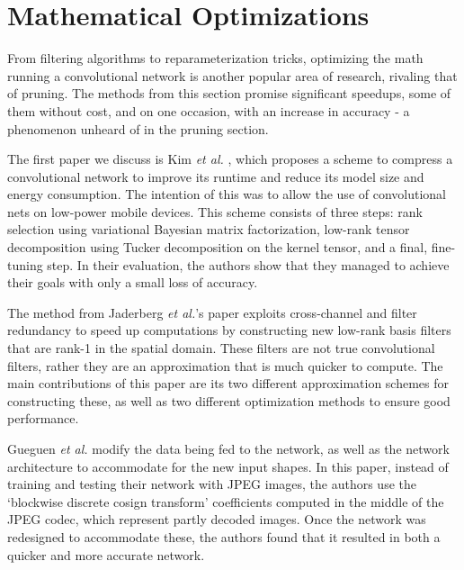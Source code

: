 \documentclass[11pt,a4paper,oldfontcommands]{memoir}
\begin{document}
\section{Mathematical Optimizations}
From filtering algorithms to reparameterization tricks, optimizing the math running a convolutional network is another popular area of research, rivaling that of pruning. The methods from this section promise significant speedups, some of them without cost, and on one occasion, with an increase in accuracy - a phenomenon unheard of in the pruning section. 

The first paper we discuss is Kim \textit{et al.} \cite{FLMA}, which proposes a scheme to compress a convolutional network to improve its runtime and reduce its model size and energy consumption. The intention of this was to allow the use of convolutional nets on low-power mobile devices. This scheme consists of three steps: rank selection using variational Bayesian matrix factorization, low-rank tensor decomposition using Tucker decomposition on the kernel tensor, and a final, fine-tuning step. In their evaluation, the authors show that they managed to achieve their goals with only a small loss of accuracy.

The method from Jaderberg \textit{et al.}'s paper \cite{LRE} exploits cross-channel and filter redundancy to speed up computations by constructing new low-rank basis filters that are rank-1 in the spatial domain. These filters are not true convolutional filters, rather they are an approximation that is much quicker to compute. The main contributions of this paper are its two different approximation schemes for constructing these, as well as two different optimization methods to ensure good performance. 

Gueguen \textit{et al.} \cite{FJPEG} modify the data being fed to the network, as well as the network architecture to accommodate for the new input shapes. In this paper, instead of training and testing their network with JPEG images, the authors use the `blockwise discrete cosign transform' coefficients computed in the middle of the JPEG codec, which represent partly decoded images. Once the network was redesigned to accommodate these, the authors found that it resulted in both a quicker and more accurate network.
\end{document}
